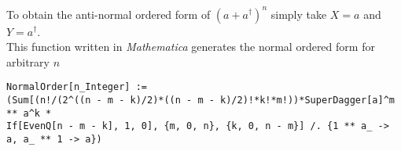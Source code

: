 \documentclass[english,12pt]{shreyasnotes}
\begin{document}
To obtain the anti-normal ordered form of $\left(a+a^{\dagger} \right)^n$ simply take $X=a$ and $Y=a^{\dagger}$.\\ This function written in \emph{Mathematica} generates the normal ordered form for arbitrary $n$
\begin{footnotesize}
\begin{verbatim}
NormalOrder[n_Integer] := 
(Sum[(n!/(2^((n - m - k)/2)*((n - m - k)/2)!*k!*m!))*SuperDagger[a]^m ** a^k * 
If[EvenQ[n - m - k], 1, 0], {m, 0, n}, {k, 0, n - m}] /. {1 ** a_ -> a, a_ ** 1 -> a})
\end{verbatim}
\end{footnotesize}
\end{document}
